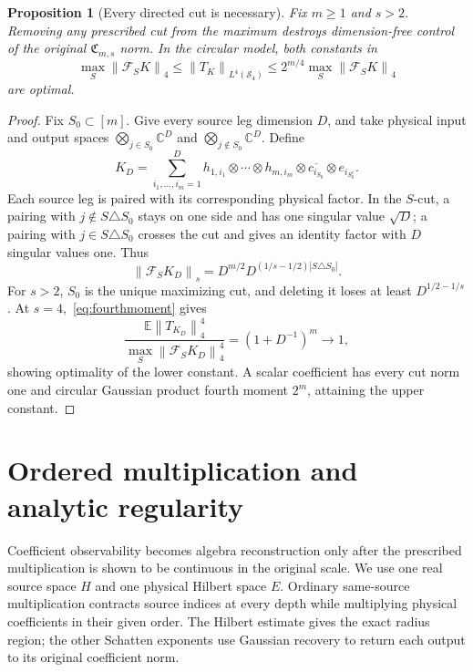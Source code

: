 \documentclass[11pt,a4paper]{amsart}
\numberwithin{equation}{section}
\newtheorem{proposition}[theorem]{Proposition}
\theoremstyle{definition}
\theoremstyle{remark}
\newcommand{\C}{\mathbb C}
\newcommand{\E}{\mathbb E}
\newcommand{\Sch}{\mathcal S}
\newcommand{\Coeff}{\mathfrak C}
\newcommand{\Flat}{\mathcal F}
\newcommand{\norm}[1]{\left\lVert#1\right\rVert}
\begin{document}
\begin{proposition}[Every directed cut is necessary]\label{prop:cut_sharpness}
Fix $m\ge1$ and $s>2$. Removing any prescribed cut from the maximum destroys dimension-free control of the original $\Coeff_{m,s}$ norm. In the circular model, both constants in
\begin{equation}\label{eq:fourth_sharp_constants}
 \max_S\norm{\Flat_SK}_4\le\norm{T_K}_{L^4(\Sch_4)}
 \le2^{m/4}\max_S\norm{\Flat_SK}_4
\end{equation}
are optimal.
\end{proposition}
\begin{proof}
Fix $S_0\subset[m]$. Give every source leg dimension $D$, and take physical input and output spaces $\bigotimes_{j\in S_0}\C^D$ and $\bigotimes_{j\notin S_0}\C^D$. Define
\[
 K_D=\sum_{i_1,\ldots,i_m=1}^D
 h_{1,i_1}\otimes\cdots\otimes h_{m,i_m}
 \otimes\overline{c_{i_{S_0}}}\otimes e_{i_{S_0^c}}.
\]
Each source leg is paired with its corresponding physical factor. In the $S$-cut, a pairing with $j\notin S\triangle S_0$ stays on one side and has one singular value $\sqrt D$; a pairing with $j\in S\triangle S_0$ crosses the cut and gives an identity factor with $D$ singular values one. Thus
\begin{equation}\label{eq:hamming_cut_profile}
 \norm{\Flat_SK_D}_s
 =D^{m/2}D^{(1/s-1/2)|S\triangle S_0|}.
\end{equation}
For $s>2$, $S_0$ is the unique maximizing cut, and deleting it loses at least $D^{1/2-1/s}$. At $s=4$,~\eqref{eq:fourthmoment} gives
\[
 \frac{\E\norm{T_{K_D}}_4^4}{\max_S\norm{\Flat_SK_D}_4^4}
 =(1+D^{-1})^m\longrightarrow1,
\]
showing optimality of the lower constant. A scalar coefficient has every cut norm one and circular Gaussian product fourth moment $2^m$, attaining the upper constant.
\end{proof}


\section{Ordered multiplication and analytic regularity}\label{sec:product}
Coefficient observability becomes algebra reconstruction only after the prescribed multiplication is shown to be continuous in the original scale. We use one real source space $H$ and one physical Hilbert space $E$. Ordinary same-source multiplication contracts source indices at every depth while multiplying physical coefficients in their given order. The Hilbert estimate gives the exact radius region; the other Schatten exponents use Gaussian recovery to return each output to its original coefficient norm.
\end{document}
